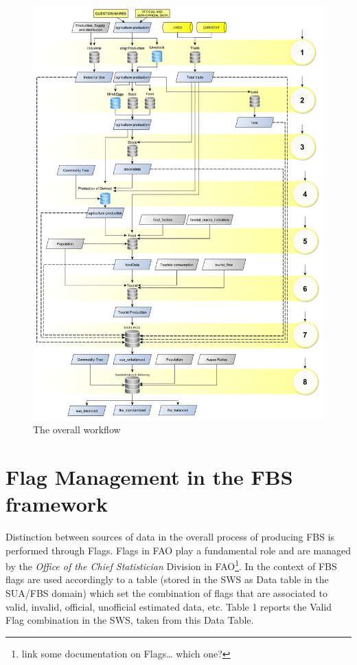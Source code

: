 \documentclass[]{article}
\let\rmarkdownfootnote\footnote%
\def\footnote{\protect\rmarkdownfootnote}
\begin{document}
\begin{figure}[H]

{\centering \includegraphics{images/SwsFbs/03_DataFlow_all} 

}

\caption{\label{fig:f3}The overall workflow}\label{fig:f3}
\end{figure}

\section*{Flag Management in the FBS
framework}\label{flag-management-in-the-fbs-framework}

Distinction between sources of data in the overall process of producing
FBS is performed through Flags. Flags in FAO play a fundamental role and
are managed by the \emph{Office of the Chief Statistician} Division in
FAO\footnote{link some documentation on Flags\ldots{} which one?}. In
the context of FBS flags are used accordingly to a table (stored in the
SWS as Data table in the SUA/FBS domain) which set the combination of
flags that are associated to valid, invalid, official, unofficial
estimated data, etc. Table 1 reports the Valid Flag combination in the
SWS, taken from this Data Table.
\end{document}
